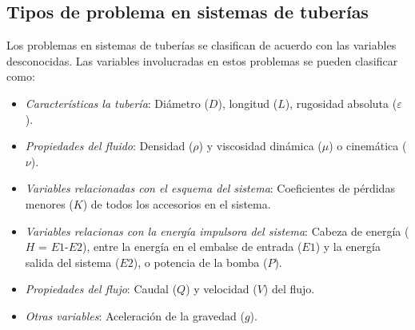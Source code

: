 \documentclass[10pt, oneside]{article}
\begin{document}
\subsection{Tipos de problema en sistemas de tuber\'ias}
Los problemas en sistemas de tuber\'ias se clasifican de acuerdo con las variables desconocidas. Las variables involucradas en estos problemas se pueden clasificar como:
\begin{itemize}
\item \emph{Caracter\'isticas la tuber\'ia}: Di\'ametro ($D$), longitud ($L$), rugosidad absoluta ($\varepsilon$).
\item \emph{Propiedades del fluido}: Densidad ($\rho$) y viscosidad din\'amica ($\mu$) o cinem\'atica ($\nu$). 
\item \emph{Variables relacionadas con el esquema del sistema}: Coeficientes de p\'erdidas menores ($K$) de todos los accesorios en el sistema. 
\item \emph{Variables relacionas con la energ\'ia impulsora del sistema}: Cabeza de energ\'ia ($H$ = $E1$-$E2$), entre la energ\'ia en el embalse de entrada ($E1$) y la energ\'ia salida del sistema ($E2$), o potencia de la bomba ($P$). 
\item \emph{Propiedades del flujo}: Caudal ($Q$) y velocidad ($V$) del flujo.
\item \emph{Otras variables}: Aceleraci\'on de la gravedad ($g$).
\end{itemize}
 
\end{document}
